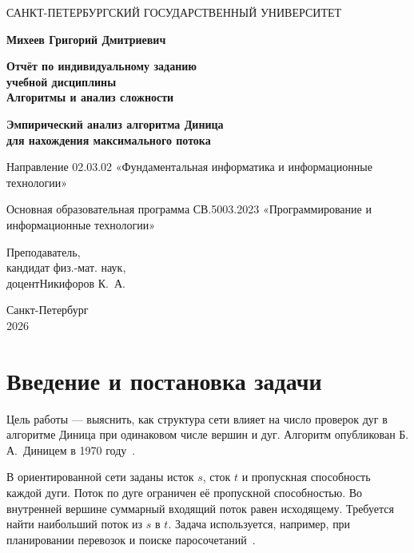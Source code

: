 \documentclass[14pt,a4paper]{extarticle}
\makeatletter
\newcommand{\reportfontsize}[1]{\fontsize{#1}{\f@baselineskip}\selectfont}
\newcommand{\reportCaptionNames}{\renewcommand{\figurename}{Рис.}\renewcommand{\tablename}{Таблица}}
\makeatother
\begin{document}
\reportCaptionNames

\begin{titlepage}
\thispagestyle{empty}
\centering
{\reportfontsize{12pt}
САНКТ-ПЕТЕРБУРГСКИЙ ГОСУДАРСТВЕННЫЙ УНИВЕРСИТЕТ\par}

\vspace{30pt}
{\reportfontsize{18pt}\bfseries Михеев Григорий Дмитриевич\par}

\vspace{37pt}
{\reportfontsize{18pt}\bfseries
Отчёт по индивидуальному заданию\\
учебной дисциплины\\
Алгоритмы и анализ сложности\par}

\vspace{50pt}
{\reportfontsize{18pt}\bfseries
Эмпирический анализ алгоритма Диница\\
для нахождения максимального потока\par}

\vspace{6pt}
Направление 02.03.02 «Фундаментальная информатика и информационные технологии»\par
Основная образовательная программа СВ.5003.2023 «Программирование и информационные технологии»\par

\vspace{48pt}
{\raggedright
Преподаватель,\\
кандидат физ.-мат. наук,\\
доцент\hfill Никифоров К.~А.\par}

\vspace{48pt}
Санкт-Петербург\\
2026
\end{titlepage}

\setcounter{page}{2}
\tableofcontents
\clearpage

\section{Введение и постановка задачи}

Цель работы --- выяснить, как структура сети влияет на число проверок дуг в алгоритме Диница при одинаковом числе вершин и дуг. Алгоритм опубликован Б. А.~Диницем в 1970 году~\cite{dinic}.

В ориентированной сети заданы исток $s$, сток $t$ и пропускная способность каждой дуги. Поток по дуге ограничен её пропускной способностью. Во внутренней вершине суммарный входящий поток равен исходящему. Требуется найти наибольший поток из $s$ в $t$. Задача используется, например, при планировании перевозок и поиске паросочетаний~\cite{sedgewick}.
\end{document}
